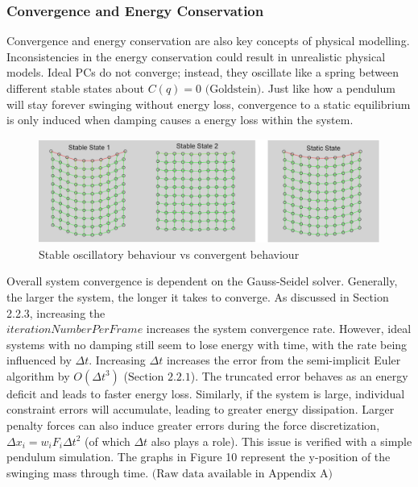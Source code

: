 \documentclass[12pt, letterpaper]{article}
\begin{document}
\subsubsection{Convergence and Energy Conservation}
\hspace{\parindent} Convergence and energy conservation are also key concepts of physical modelling. Inconsistencies in the energy conservation could result in unrealistic physical models. Ideal PCs do not converge; instead, they oscillate like a spring between different stable states about $C(q) = 0$ $\text{(Goldstein)}$. Just like how a pendulum will stay forever swinging without energy loss, convergence to a static equilibrium is only induced when damping causes a energy loss within the system.
\begin{figure}[H]
\centering
\includegraphics[width=14cm]{pc stable-static.png}
\caption{Stable oscillatory behaviour vs convergent behaviour}
\label{fig:figure}
\end{figure} 
\noindent Overall system convergence is dependent on the Gauss-Seidel solver. Generally, the larger the system, the longer it takes to converge. As discussed in Section 2.2.3, increasing the \\$iterationNumberPerFrame$ increases the system convergence rate. However, ideal systems with no damping still seem to lose energy with time, with the rate being influenced by $\Delta t$. Increasing $\Delta t$ increases the error from the semi-implicit Euler algorithm by $O(\Delta t^3)$ ($\text{Section 2.2.1}$). The truncated error behaves as an energy deficit and leads to faster energy loss. Similarly, if the system is large, individual constraint errors will accumulate, leading to greater energy dissipation. Larger penalty forces can also induce greater errors during the force discretization, $\Delta x_i = w_i F_i \Delta t^2 $ (of which $\Delta t$ also plays a role). This issue is verified with a simple pendulum simulation. The graphs in Figure 10 represent the y-position of the swinging mass through time. $\text{(Raw data available in Appendix A)}$
\end{document}
